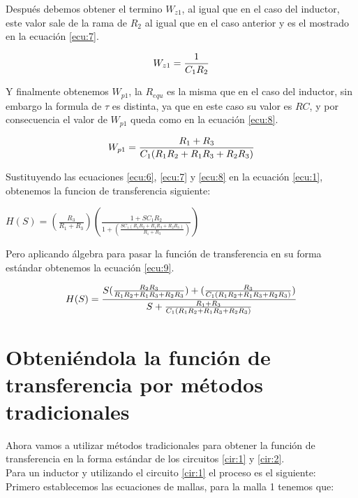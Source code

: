 \documentclass[letterpaper,spanish,12pt]{report}
\begin{document}
Despu\'es debemos obtener el termino $W_{z1}$, al igual que en el caso del inductor, este valor sale de la rama de $R_{2}$ al igual que en el caso anterior y es el mostrado en la ecuaci\'on \ref{ecu:7}.

	\begin{equation}
		\centering
		W_{z1} = \frac{1}{C_{1}R_{2}}
		\label{ecu:7}
	\end{equation}

Y finalmente obtenemos $W_{p1}$, la $R_{equ}$ es la misma que en el caso del inductor, sin embargo la formula de $\tau$ es distinta, ya que en este caso su valor es $RC$, y por consecuencia el valor de $W_{p1}$ queda como en la ecuaci\'on \ref{ecu:8}.

	\begin{equation}
		\centering
		W_{p1} = \frac{R_{1}+R_{3}}{C_{1}(R_{1}R_{2}+R_{1}R_{3}+R_{2}R_{3})}
		\label{ecu:8}
	\end{equation}

Sustituyendo las ecuaciones \ref{ecu:6}, \ref{ecu:7} y \ref{ecu:8} en la ecuaci\'on \ref{ecu:1}, obtenemos la funcion de transferencia siguiente:

	\begin{center} $H(S) = (\frac{R_{3}}{R_{1}+R_{3}})(\frac{1+SC_{1}R_{2}}{1+(\frac{SC_{1}(R_{1}R_{2}+R_{1}R_{3}+R_{2}R_{3})}{R_{1}+R_{3}})})$ \end{center}

Pero aplicando \'algebra para pasar la funci\'on de transferencia en su forma est\'andar obtenemos la ecuaci\'on \ref{ecu:9}.

	\begin{equation}
		\centering
		H(S) = \frac{ S(\frac{R_{2}R_{3}}{R_{1}R_{2}+R_{1}R_{3}+R_{2}R_{3}}) + (\frac{R_{3}}{C_{1}(R_{1}R_{2}+R_{1}R_{3}+R_{2}R_{3})})}{ S + \frac{R_{1}+R_{3}}{C_{1}(R_{1}R_{2}+R_{1}R_{3}+R_{2}R_{3})} }
		\label{ecu:9}
	\end{equation}

	\section{Obteni\'endola la funci\'on de transferencia por m\'etodos tradicionales}

Ahora vamos a utilizar m\'etodos tradicionales para obtener la funci\'on de transferencia en la forma est\'andar de los circuitos \ref{cir:1} y \ref{cir:2}. \\ \medskip Para un inductor y utilizando el circuito \ref{cir:1} el proceso es el siguiente: \\ \medskip Primero establecemos las ecuaciones de mallas, para la malla 1 tenemos que:
\end{document}
